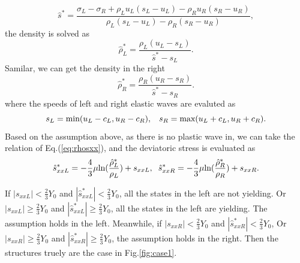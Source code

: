 \documentclass{article}
\numberwithin{equation}{section}
\numberwithin{table}{section}
\begin{document}
\begin{equation}
 \hat{s}^* = \frac{\sigma_L-\sigma_R+\rho_L u_L(s_L-u_L)-\rho_R u_R(s_R-u_R)}{\rho_L(s_L-u_L)-\rho_R(s_R-u_R)},
\end{equation}
the density is solved as
\begin{equation}\label{eq:rhoLs}
  \hat{\rho}_L^* = \frac{\rho_L(u_L-s_L)}{\hat{s}^*-s_L}.
\end{equation}
Samilar, we can get the density in the right 
\begin{equation}\label{eq:rhoLs}
  \hat{\rho}_R^* = \frac{\rho_R(u_R-s_R)}{\hat{s}^*-s_R}.
\end{equation}
where the speeds of left and right elastic waves are evaluted as 
	\begin{equation}\label{eq:sLR}
	  s_L = \text{min} (u_L-c_L, u_R-c_R), \hspace{0.3cm} s_R = \text{max}(u_L+c_L, u_R+c_R).
	\end{equation}
Based on the assumption above, as there is no plastic wave in, we can take the relation of Eq.(\ref{eq:rhosxx}), and the deviatoric stress is evaluated as 
\begin{equation}
  \hat{s}_{xxL}^*=-\frac{4}{3}\mu\text{ln}(\frac{\hat{\rho}_L^*}{\rho_L})+s_{xxL},\hspace{0.2cm}  \hat{s}_{xxR}^*=-\frac{4}{3}\mu\text{ln}(\frac{\hat{\rho}_R^*}{\rho_R})+s_{xxR}.
\end{equation}

If $|s_{xxL}|<\frac{2}{3}Y_0$ and $|\hat{s}_{xxL}^*| < \frac{2}{3}Y_0$, all the states in the left are not yielding. Or  $|s_{xxL}| \ge \frac{2}{3}Y_0$ and $|\hat{s}_{xxL}^*| \ge  \frac{2}{3}Y_0$, all the states in the left are yielding. The assumption  holds in the left. 
Meanwhile, if $|s_{xxR}|<\frac{2}{3}Y_0$ and $|\hat{s}_{xxR}^*| < \frac{2}{3}Y_0$, Or $|s_{xxR}| \ge \frac{2}{3}Y_0$ and $|\hat{s}_{xxR}^*| \ge  \frac{2}{3}Y_0$, the assumption holds in the right. Then the structures  truely are  the case in Fig.\ref{fig:case1}. 
\end{document}
